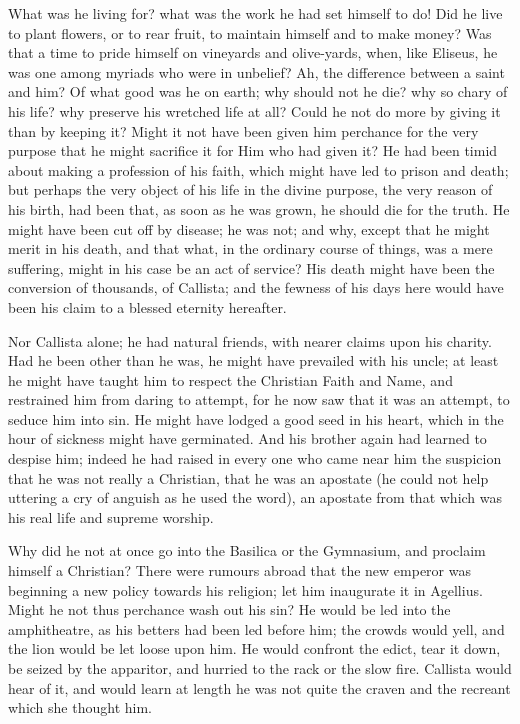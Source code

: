 What was he living for? what was the work he had set himself to do!
Did he live to plant flowers, or to rear fruit, to maintain himself
and to make money? Was that a time to pride himself on vineyards and
olive-yards, when, like Eliseus, he was one among myriads who were in
unbelief? Ah, the difference between a saint and him? Of what good was
he on earth; why should not he die? why so chary of his life? why
preserve his wretched life at all? Could he not do more by giving it
than by keeping it? Might it not have been given him perchance for the
very purpose that he might sacrifice it for Him who had given it? He
had been timid about making a profession of his faith, which might
have led to prison and death; but perhaps the very object of his life
in the divine purpose, the very reason of his birth, had been that, as
soon as he was grown, he should die for the truth. He might have been
cut off by disease; he was not; and why, except that he might merit in
his death, and that what, in the ordinary course of things, was a mere
suffering, might in his case be an act of service? His death might
have been the conversion of thousands, of Callista; and the fewness of
his days here would have been his claim to a blessed eternity
hereafter.

Nor Callista alone; he had natural friends, with nearer claims upon
his charity. Had he been other than he was, he might have prevailed
with his uncle; at least he might have taught him to respect the
Christian Faith and Name, and restrained him from daring to attempt,
for he now saw that it was an attempt, to seduce him into sin. He
might have lodged a good seed in his heart, which in the hour of
sickness might have germinated. And his brother again had learned to
despise him; indeed he had raised in every one who came near him the
suspicion that he was not really a Christian, that he was an apostate
(he could not help uttering a cry of anguish as he used the word), an
apostate from that which was his real life and supreme worship.

Why did he not at once go into the Basilica or the Gymnasium, and
proclaim himself a Christian? There were rumours abroad that the new
emperor was beginning a new policy towards his religion; let him
inaugurate it in Agellius. Might he not thus perchance wash out his
sin? He would be led into the amphitheatre, as his betters had been
led before him; the crowds would yell, and the lion would be let loose
upon him. He would confront the edict, tear it down, be seized by the
apparitor, and hurried to the rack or the slow fire. Callista would
hear of it, and would learn at length he was not quite the craven and
the recreant which she thought him.

